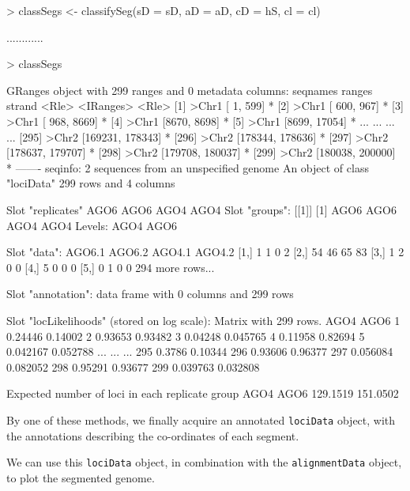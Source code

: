 \documentclass[a4paper]{article}
\begin{document}
\begin{Schunk}
\begin{Sinput}
> classSegs <- classifySeg(sD = sD, aD = aD, cD = hS, cl = cl)      
\end{Sinput}
\begin{Soutput}
............
\end{Soutput}
\begin{Sinput}
> classSegs
\end{Sinput}
\begin{Soutput}
GRanges object with 299 ranges and 0 metadata columns:
        seqnames           ranges strand
           <Rle>        <IRanges>  <Rle>
    [1]    >Chr1    [   1,   599]      *
    [2]    >Chr1    [ 600,   967]      *
    [3]    >Chr1    [ 968,  8669]      *
    [4]    >Chr1    [8670,  8698]      *
    [5]    >Chr1    [8699, 17054]      *
    ...      ...              ...    ...
  [295]    >Chr2 [169231, 178343]      *
  [296]    >Chr2 [178344, 178636]      *
  [297]    >Chr2 [178637, 179707]      *
  [298]    >Chr2 [179708, 180037]      *
  [299]    >Chr2 [180038, 200000]      *
  -------
  seqinfo: 2 sequences from an unspecified genome
An object of class "lociData"
299 rows and 4 columns

Slot "replicates"
AGO6 AGO6 AGO4 AGO4
Slot "groups":
[[1]]
[1] AGO6 AGO6 AGO4 AGO4
Levels: AGO4 AGO6


Slot "data":
     AGO6.1 AGO6.2 AGO4.1 AGO4.2
[1,]      1      1      0      2
[2,]     54     46     65     83
[3,]      1      2      0      0
[4,]      5      0      0      0
[5,]      0      1      0      0
294 more rows...

Slot "annotation":
data frame with 0 columns and 299 rows

Slot "locLikelihoods" (stored on log scale):
Matrix with  299  rows.
        AGO4     AGO6
1    0.24446  0.14002
2    0.93653  0.93482
3    0.04248 0.045765
4    0.11958  0.82694
5   0.042167 0.052788
...      ...      ...
295   0.3786  0.10344
296  0.93606  0.96377
297 0.056084 0.082052
298  0.95291  0.93677
299 0.039763 0.032808

Expected number of loci in each replicate group
    AGO4     AGO6 
129.1519 151.0502 
\end{Soutput}
\end{Schunk}

By one of these methods, we finally acquire an annotated \verb'lociData' object, with the annotations describing the co-ordinates of each segment.


We can use this \verb'lociData' object, in combination with the \verb'alignmentData' object, to plot the segmented genome.
\end{document}
